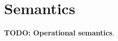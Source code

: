\documentclass[../main.tex]{subfiles}
\begin{document}
\section{Semantics}\label{section:semantics}

\textbf{TODO: Operational semantics}.
\end{document}
